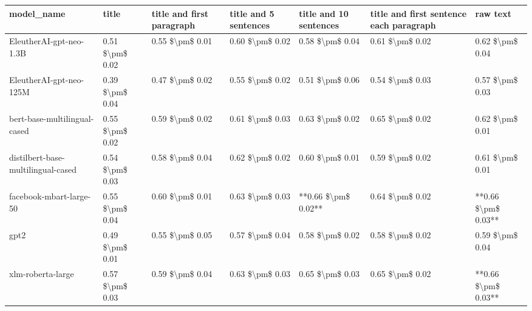 \begin{tabular}{lllllll}
\toprule
                        model\_name &           title & title and first paragraph & title and 5 sentences & title and 10 sentences & title and first sentence each paragraph &            raw text \\
\midrule
           EleutherAI-gpt-neo-1.3B & 0.51 \$\textbackslash pm\$ 0.02 &           0.55 \$\textbackslash pm\$ 0.01 &       0.60 \$\textbackslash pm\$ 0.02 &        0.58 \$\textbackslash pm\$ 0.04 &                         0.61 \$\textbackslash pm\$ 0.02 &     0.62 \$\textbackslash pm\$ 0.04 \\
           EleutherAI-gpt-neo-125M & 0.39 \$\textbackslash pm\$ 0.04 &           0.47 \$\textbackslash pm\$ 0.02 &       0.55 \$\textbackslash pm\$ 0.02 &        0.51 \$\textbackslash pm\$ 0.06 &                         0.54 \$\textbackslash pm\$ 0.03 &     0.57 \$\textbackslash pm\$ 0.03 \\
      bert-base-multilingual-cased & 0.55 \$\textbackslash pm\$ 0.02 &           0.59 \$\textbackslash pm\$ 0.02 &       0.61 \$\textbackslash pm\$ 0.03 &        0.63 \$\textbackslash pm\$ 0.02 &                         0.65 \$\textbackslash pm\$ 0.02 &     0.62 \$\textbackslash pm\$ 0.01 \\
distilbert-base-multilingual-cased & 0.54 \$\textbackslash pm\$ 0.03 &           0.58 \$\textbackslash pm\$ 0.04 &       0.62 \$\textbackslash pm\$ 0.02 &        0.60 \$\textbackslash pm\$ 0.01 &                         0.59 \$\textbackslash pm\$ 0.02 &     0.61 \$\textbackslash pm\$ 0.01 \\
           facebook-mbart-large-50 & 0.55 \$\textbackslash pm\$ 0.04 &           0.60 \$\textbackslash pm\$ 0.01 &       0.63 \$\textbackslash pm\$ 0.03 &    **0.66 \$\textbackslash pm\$ 0.02** &                         0.64 \$\textbackslash pm\$ 0.02 & **0.66 \$\textbackslash pm\$ 0.03** \\
                              gpt2 & 0.49 \$\textbackslash pm\$ 0.01 &           0.55 \$\textbackslash pm\$ 0.05 &       0.57 \$\textbackslash pm\$ 0.04 &        0.58 \$\textbackslash pm\$ 0.02 &                         0.58 \$\textbackslash pm\$ 0.02 &     0.59 \$\textbackslash pm\$ 0.04 \\
                 xlm-roberta-large & 0.57 \$\textbackslash pm\$ 0.03 &           0.59 \$\textbackslash pm\$ 0.04 &       0.63 \$\textbackslash pm\$ 0.03 &        0.65 \$\textbackslash pm\$ 0.03 &                         0.65 \$\textbackslash pm\$ 0.02 & **0.66 \$\textbackslash pm\$ 0.03** \\
\bottomrule
\end{tabular}
